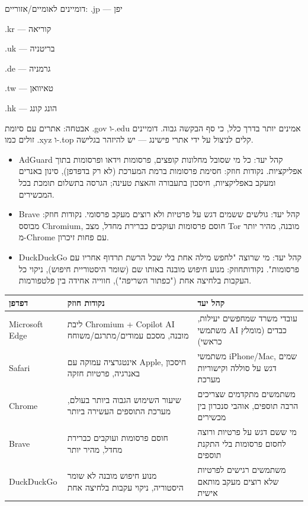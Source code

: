 דומיינים לאומיים/אזוריים: .jp — יפן

.kr — קוריאה

.uk — בריטניה

.de — גרמניה

.tw — טאיוואן

.hk — הונג קונג

אבטחה: אתרים עם סיומת .gov ו-.edu אמינים יותר בדרך כלל, כי סף הבקשה גבוה. דומיינים זולים כמו .xyz ו-.top קלים לניצול על ידי אתרי פישינג — יש להיזהר בגלישה.


\begin{itemize}
  \item AdGuard קהל יעד: כל מי שסובל מחלונות קופצים, פרסומות וידאו ופרסומות בתוך אפליקציות. נקודות חוזק: חסימת פרסומות ברמת המערכת (לא רק בדפדפן), סינון באנרים ומעקב באפליקציות, חיסכון בתעבורה והאצת טעינה; הגרסה בתשלום תומכת בכל המכשירים.
\end{itemize}


\begin{itemize}
  \item Brave קהל יעד: גולשים ששמים דגש על פרטיות ולא רוצים מעקב פרסומי. נקודות חוזק: מבוסס Chromium, חוסם פרסומות ועוקבים כברירת מחדל, מצב Tor מובנה, מהיר יותר מ-Chrome עם פחות זיכרון.
  \item DuckDuckGo קהל יעד: מי שרוצה "לחפש מילה אחת בלי שכל הרשת תרדוף אחריו עם פרסומות". נקודותחוזק: מנוע חיפוש מובנה באותו שם (שומר היסטוריית חיפוש), ניקוי כל העקבות בלחיצה אחת ("כפתור השריפה"), חווייה אחידה בין פלטפורמות.
\end{itemize}


\begin{center}
\begin{tabularx}{\linewidth}{|X|X|X|}
\hline
\textbf{דפדפן} & \textbf{נקודות חוזק} & \textbf{קהל יעד} \tabularnewline
\hline
Microsoft Edge & ליבת Chromium + Copilot AI מובנה, מסכם עמודים/מתרגם/משוחח & עובדי משרד שמחפשים יעילות, משתמשי AI כבדים (מומלץ כראשי) \tabularnewline
Safari & אינטגרציה עמוקה עם Apple, חיסכון באנרגיה, פרטיות חזקה & משתמשי iPhone/Mac, שמים דגש על סוללה וקישוריות מערכת \tabularnewline
Chrome & שיעור השימוש הגבוה ביותר בעולם, מערכת התוספים העשירה ביותר & משתמשים מתקדמים שצריכים הרבה תוספים, אוהבי סנכרון בין מכשירים \tabularnewline
Brave & חוסם פרסומות ועוקבים כברירת מחדל, מהיר יותר & מי ששם דגש על פרטיות ורוצה לחסום פרסומות בלי התקנת תוספים \tabularnewline
DuckDuckGo & מנוע חיפוש מובנה לא שומר היסטוריה, ניקוי עקבות בלחיצה אחת & משתמשים רגישים לפרטיות שלא רוצים מעקב מותאם אישית \tabularnewline
\hline
\end{tabularx}
\end{center}

